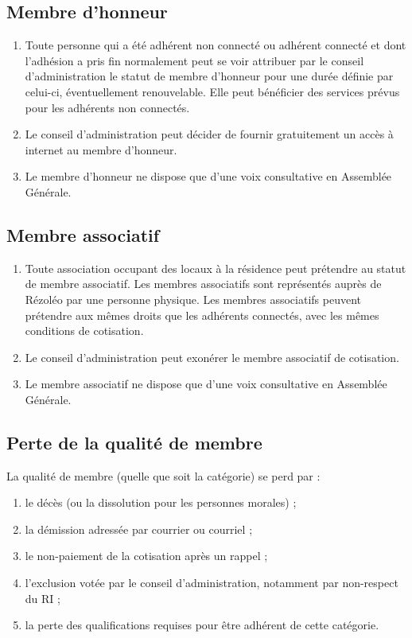 \documentclass[12pt, a4paper]{article}
\begin{document}
\subsection{Membre d’honneur}

\begin{enumerate}
    \item Toute personne qui a été adhérent non connecté ou adhérent connecté et dont l’adhésion a pris fin normalement peut se voir attribuer par le conseil d’administration le statut de membre d’honneur pour une durée définie par celui-ci, éventuellement renouvelable. Elle peut bénéficier des services prévus pour les adhérents non connectés.
    \item Le conseil d’administration peut décider de fournir gratuitement un accès à internet au membre d’honneur.
    \item Le membre d’honneur ne dispose que d’une voix consultative en Assemblée Générale.
\end{enumerate}

\subsection{Membre associatif}
\begin{enumerate}
    \item Toute association occupant des locaux à la résidence peut prétendre au statut de membre associatif. Les membres associatifs sont représentés auprès de Rézoléo par une personne physique. Les membres associatifs peuvent prétendre aux mêmes droits que les adhérents connectés, avec les mêmes conditions de cotisation.
    \item Le conseil d’administration peut exonérer le membre associatif de cotisation.
    \item Le membre associatif ne dispose que d’une voix consultative en Assemblée Générale.
\end{enumerate}

\subsection{Perte de la qualité de membre} \label{article:perte}

La qualité de membre (quelle que soit la catégorie) se perd par :

\begin{enumerate}
    \item le décès (ou la dissolution pour les personnes morales) ;
    \item la démission adressée par courrier ou courriel ;
    \item le non-paiement de la cotisation après un rappel ;
    \item l’exclusion votée par le conseil d’administration, notamment par non-respect du RI ;
    \item la perte des qualifications requises pour être adhérent de cette catégorie.
\end{enumerate}
\end{document}
